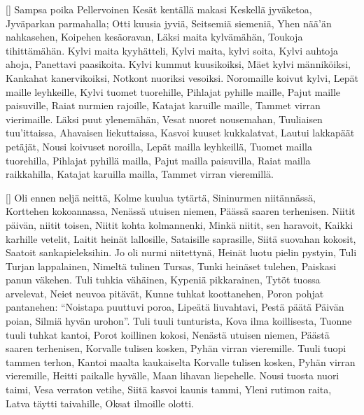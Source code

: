 []
  \beginverse
    Sampsa poika Pellervoinen
    Kesät kentällä makasi
    Keskellä jyväketoa,
    Jyväparkan parmahalla;
    Otti kuusia jyviä,
    Seitsemiä siemeniä,
    Yhen nää'än nahkasehen,
    Koipehen kesäoravan,
    Läksi maita kylvämähän,
    Toukoja tihittämähän.
  \endverse
  \beginverse
    Kylvi maita kyyhätteli,
    Kylvi maita, kylvi soita,
    Kylvi auhtoja ahoja,
    Panettavi paasikoita.
    Kylvi kummut kuusikoiksi,
    Mäet kylvi männiköiksi,
    Kankahat kanervikoiksi,
    Notkont nuoriksi vesoiksi.
    Noromaille koivut kylvi,
    Lepät maille leyhkeille,
    Kylvi tuomet tuorehille,
    Pihlajat pyhille maille,
    Pajut maille paisuville,
    Raiat nurmien rajoille,
    Katajat karuille maille,
    Tammet virran vierimaille.
  \endverse
  \beginverse
    Läksi puut ylenemähän,
    Vesat nuoret nousemahan,
    Tuuliaisen tuu'ittaissa,
    Ahavaisen liekuttaissa,
    Kasvoi kuuset kukkalatvat,
    Lautui lakkapäät petäjät,
    Nousi koivuset noroilla,
    Lepät mailla leyhkeillä,
    Tuomet mailla tuorehilla,
    Pihlajat pyhillä mailla,
    Pajut mailla paisuvilla,
    Raiat mailla raikkahilla,
    Katajat karuilla mailla,
    Tammet virran vieremillä.
  \endverse
\endsong


[]
  \beginverse
    Oli ennen neljä neittä,
    Kolme kuulua tytärtä,
    Sininurmen niitännässä,
    Korttehen kokoannassa,
    Nenässä utuisen niemen,
    Päässä saaren terhenisen.
    Niitit päivän, niitit toisen,
    Niitit kohta kolmannenki,
    Minkä niitit, sen haravoit,
    Kaikki karhille vetelit,
    Laitit heinät lallosille,
    Sataisille saprasille,
    Siitä suovahan kokosit,
    Saatoit sankapieleksihin.
  \endverse
  \beginverse
    Jo oli nurmi niitettynä,
    Heinät luotu pielin pystyin,
    Tuli Turjan lappalainen,
    Nimeltä tulinen Tursas,
    Tunki heinäset tulehen,
    Paiskasi panun väkehen.
  \endverse
  \beginverse
    Tuli tuhkia vähäinen,
    Kypeniä pikkarainen,
    Tytöt tuossa arvelevat,
    Neiet neuvoa pitävät,
    Kunne tuhkat koottanehen,
    Poron pohjat pantanehen:
    ``Noistapa puuttuvi poroa,
    Lipeätä liuvahtavi,
    Pestä päätä Päivän poian,
    Silmiä hyvän urohon''.
  \endverse
  \beginverse
    Tuli tuuli tunturista,
    Kova ilma koillisesta,
    Tuonne tuuli tuhkat kantoi,
    Porot koillinen kokosi,
    Nenästä utuisen niemen,
    Päästä saaren terhenisen,
    Korvalle tulisen kosken,
    Pyhän virran vieremille.
    Tuuli tuopi tammen terhon,
    Kantoi maalta kaukaiselta
    Korvalle tulisen kosken,
    Pyhän virran vieremille,
    Heitti paikalle hyvälle,
    Maan lihavan liepehelle.
    Nousi tuosta nuori taimi,
    Vesa verraton vetihe,
    Siitä kasvoi kaunis tammi,
    Yleni rutimon raita,
    Latva täytti taivahille,
    Oksat ilmoille olotti.
  \endverse
\endsong


